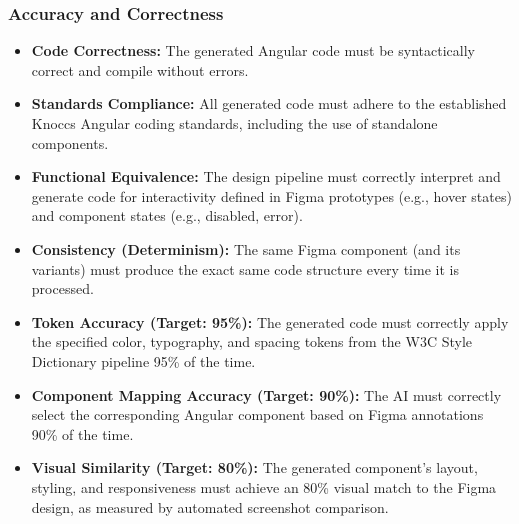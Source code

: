 \subsubsection{Accuracy and Correctness}
\begin{itemize}
    \item \textbf{Code Correctness:} The generated Angular code must be syntactically correct and compile without errors.
    \item \textbf{Standards Compliance:} All generated code must adhere to the established Knoccs Angular coding standards, including the use of standalone components.
    \item \textbf{Functional Equivalence:} The design pipeline must correctly interpret and generate code for interactivity defined in Figma prototypes (e.g., hover states) and component states (e.g., disabled, error).
    \item \textbf{Consistency (Determinism):} The same Figma component (and its variants) must produce the exact same code structure every time it is processed.
    \item \textbf{Token Accuracy (Target: 95\%):} The generated code must correctly apply the specified color, typography, and spacing tokens from the W3C Style Dictionary pipeline 95\% of the time.
    \item \textbf{Component Mapping Accuracy (Target: 90\%):} The AI must correctly select the corresponding Angular component based on Figma annotations 90\% of the time.
    \item \textbf{Visual Similarity (Target: 80\%):} The generated component's layout, styling, and responsiveness must achieve an 80\% visual match to the Figma design, as measured by automated screenshot comparison.
\end{itemize}

